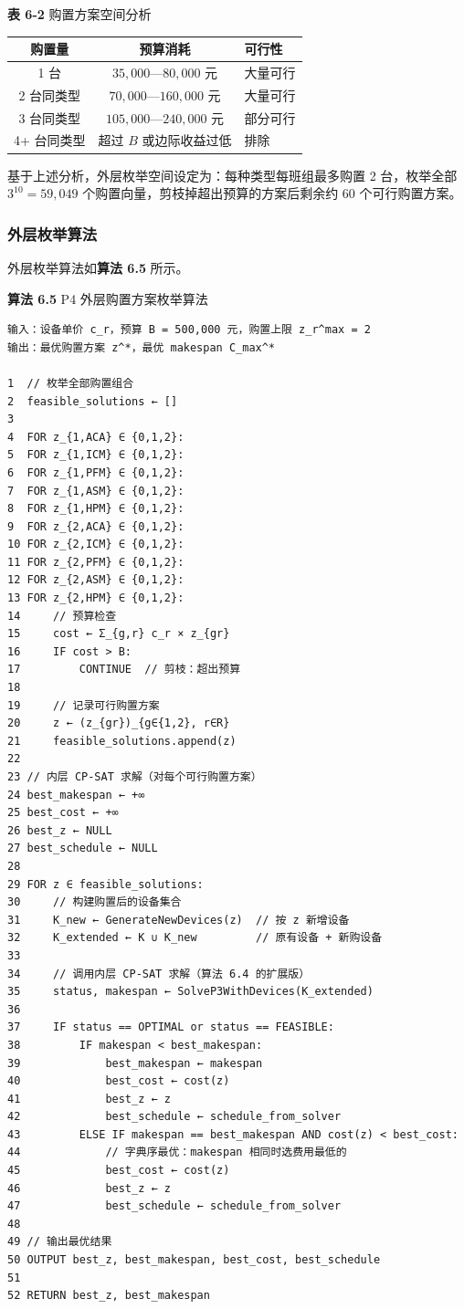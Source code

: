 \documentclass[UTF8,a4paper,12pt]{ctexart}
\begin{document}
\begin{center}
\textbf{表 6-2} 购置方案空间分析
\begin{tabular}{ccl}
\toprule
购置量 & 预算消耗 & 可行性 \\
\midrule
1 台 & $35{,}000$—$80{,}000$ 元 & 大量可行 \\
2 台同类型 & $70{,}000$—$160{,}000$ 元 & 大量可行 \\
3 台同类型 & $105{,}000$—$240{,}000$ 元 & 部分可行 \\
4+ 台同类型 & 超过 $B$ 或边际收益过低 & 排除 \\
\bottomrule
\end{tabular}
\end{center}

基于上述分析，外层枚举空间设定为：每种类型每班组最多购置 2 台，枚举全部 $3^{10} = 59{,}049$ 个购置向量，剪枝掉超出预算的方案后剩余约 60 个可行购置方案。

\subsubsection{外层枚举算法}
外层枚举算法如\textbf{算法 6.5} 所示。

\textbf{算法 6.5} P4 外层购置方案枚举算法
\begin{verbatim}
输入：设备单价 c_r，预算 B = 500,000 元，购置上限 z_r^max = 2
输出：最优购置方案 z^*，最优 makespan C_max^*

1  // 枚举全部购置组合
2  feasible_solutions ← []
3
4  FOR z_{1,ACA} ∈ {0,1,2}:
5  FOR z_{1,ICM} ∈ {0,1,2}:
6  FOR z_{1,PFM} ∈ {0,1,2}:
7  FOR z_{1,ASM} ∈ {0,1,2}:
8  FOR z_{1,HPM} ∈ {0,1,2}:
9  FOR z_{2,ACA} ∈ {0,1,2}:
10 FOR z_{2,ICM} ∈ {0,1,2}:
11 FOR z_{2,PFM} ∈ {0,1,2}:
12 FOR z_{2,ASM} ∈ {0,1,2}:
13 FOR z_{2,HPM} ∈ {0,1,2}:
14     // 预算检查
15     cost ← Σ_{g,r} c_r × z_{gr}
16     IF cost > B:
17         CONTINUE  // 剪枝：超出预算
18   
19     // 记录可行购置方案
20     z ← (z_{gr})_{g∈{1,2}, r∈R}
21     feasible_solutions.append(z)
22 
23 // 内层 CP-SAT 求解（对每个可行购置方案）
24 best_makespan ← +∞
25 best_cost ← +∞
26 best_z ← NULL
27 best_schedule ← NULL
28 
29 FOR z ∈ feasible_solutions:
30     // 构建购置后的设备集合
31     K_new ← GenerateNewDevices(z)  // 按 z 新增设备
32     K_extended ← K ∪ K_new         // 原有设备 + 新购设备
33   
34     // 调用内层 CP-SAT 求解（算法 6.4 的扩展版）
35     status, makespan ← SolveP3WithDevices(K_extended)
36   
37     IF status == OPTIMAL or status == FEASIBLE:
38         IF makespan < best_makespan:
39             best_makespan ← makespan
40             best_cost ← cost(z)
41             best_z ← z
42             best_schedule ← schedule_from_solver
43         ELSE IF makespan == best_makespan AND cost(z) < best_cost:
44             // 字典序最优：makespan 相同时选费用最低的
45             best_cost ← cost(z)
46             best_z ← z
47             best_schedule ← schedule_from_solver
48 
49 // 输出最优结果
50 OUTPUT best_z, best_makespan, best_cost, best_schedule
51 
52 RETURN best_z, best_makespan
\end{verbatim}
\end{document}

